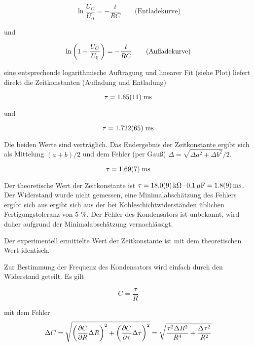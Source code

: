 \begin{equation}
  \ln \frac{U_C}{U_0} = -\frac{t}{RC} \qquad \text{(Entladekurve)}
\end{equation}

und

\begin{equation}
  \ln \del{1 - \frac{U_C}{U_0}} = -\frac{t}{RC} \qquad \text{(Aufladekurve)}
\end{equation}

eine entsprechende logarithmische Auftragung und linearer Fit (siehe Plot)
liefert direkt die Zeitkonstanten (Aufladung und Entladung)

\begin{equation}
  \tau = \num{1.65+-0.11} \; \text{ms}
\end{equation}

und

\begin{equation}
  \tau = \num{1.722+-0.065} \; \text{ms}
\end{equation}

Die beiden Werte sind verträglich. Das Endergebnis der Zeitkonstante ergibt
sich als Mittelung $(a+b)/2$ und dem Fehler (per Gauß) $\Delta = \sqrt{\Delta
a^2 + \Delta b^2}/2$.

\begin{equation}
  \tau = \num{1.69\pm0.07} \; \text{ms}
\end{equation}

Der theoretische Wert der Zeitkonstante ist $\tau =
\num{18.0+-0.9}\,\text{k}\Omega \cdot 0{,}1\,\mathrm{\mu} \text{F} =
\num{1.8+-0.9} \, \text{ms}$. Der Widerstand wurde nicht gemessen, eine
Minimalabschätzung des Fehlers ergibt sich aus ergibt sich aus der bei
Kohleschichtwiderständen üblichen Fertigungstoleranz von 5 \%. Der Fehler des
Kondensators ist unbekannt, wird daher aufgrund der Minimalabschätzung
vernachlässigt.

Der experimentell ermittelte Wert der Zeitkonstante ist mit dem theoretischen
Wert identisch.

Zur Bestimmung der Frequenz des Kondensators wird einfach durch den Widerstand
geteilt. Es gilt

\begin{equation}
  C = \frac{\tau}{R}
\end{equation}

mit dem Fehler
\begin{equation}
  \Delta C = \sqrt{
    \del{\frac{\partial C}{\partial R} \Delta R}^2 +
    \del{\frac{\partial C}{\partial \tau} \Delta \tau}^2
  }
  = \sqrt{
    \frac{\tau^2 \Delta R^2}{R^4} + \frac{\Delta \tau^2}{R^2}
  }
\end{equation}

